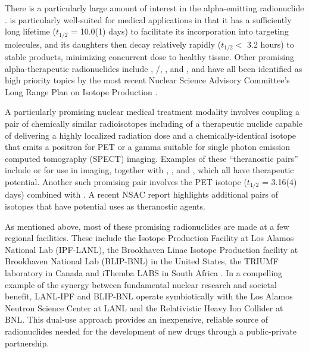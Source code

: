 \documentclass[letterpaper]{ar-1col}
\begin{document}
There is a particularly large amount of interest in the alpha-emitting radionuclide .   is particularly well-suited for medical applications in that it has a sufficiently long lifetime ($t_{1/2}$ = 10.0(1) days) to facilitate its incorporation into targeting molecules, and its daughters then decay relatively rapidly ($t_{1/2}<$ 3.2 hours) to stable products, minimizing concurrent dose to healthy tissue. Other promising alpha-therapeutic radionuclides include , /, ,  and , and have all been identified as high priority topics by the most recent Nuclear Science Advisory Committee's Long Range Plan on Isotope Production \cite{NSACIsotopesSubcommittee2015}.

A particularly promising  nuclear medical treatment modality involves coupling a pair of chemically similar radioisotopes including of a therapeutic nuclide capable of delivering a highly localized radiation dose and a chemically-identical isotope that emits a positron for PET or a gamma suitable for single photon emission computed tomography (SPECT) imaging.
Examples of these \enquote{theranostic pairs} include  or  for use in imaging, together with , , and , which all have  therapeutic potential.
Another such promising  pair involves the PET isotope  ($t_{1/2}$ = 3.16(4) days) combined with .  A recent NSAC report \cite{NSACIsotopesSubcommittee2015} highlights additional pairs of isotopes that have potential uses as theranostic agents. 

As mentioned above, most of these promising radionuclides are made at a few regional facilities.  These include the Isotope Production Facility at Los Alamos National Lab (IPF-LANL), the Brookhaven Linac Isotope Production facility at Brookhaven National Lab (BLIP-BNL) in the United States, the TRIUMF laboratory in Canada and iThemba LABS in South Africa \cite{Iae675,NSACIsotopesSubcommittee2015}.  In a compelling example of the synergy between fundamental nuclear research and societal benefit, LANL-IPF and BLIP-BNL operate symbiotically with the Los Alamos Neutron Science Center at LANL and the Relativistic Heavy Ion Collider at BNL.  This dual-use approach provides an inexpensive, reliable source of radionuclides needed for the development of new drugs through a public-private partnership. 
\end{document}
